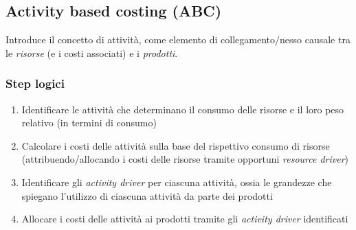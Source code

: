 \subsection{Activity based costing (ABC)}
Introduce il concetto di attività, come elemento di collegamento/nesso causale
tra le \emph{risorse} (e i costi associati) e i \emph{prodotti}.

\subsubsection{Step logici}
\begin{enumerate}
    \item Identificare le attività che determinano il consumo delle risorse e il
    loro peso relativo (in termini di consumo)
    \item Calcolare i costi delle attività sulla base del rispettivo consumo di
    risorse (attribuendo/allocando i costi delle risorse tramite opportuni
    \emph{resource driver})
    \item Identificare gli \emph{activity driver} per ciascuna attività, ossia le
    grandezze che spiegano l’utilizzo di ciascuna attività da parte dei
    prodotti
    \item Allocare i costi delle attività ai prodotti tramite gli \emph{activity driver}
    identificati
\end{enumerate}
